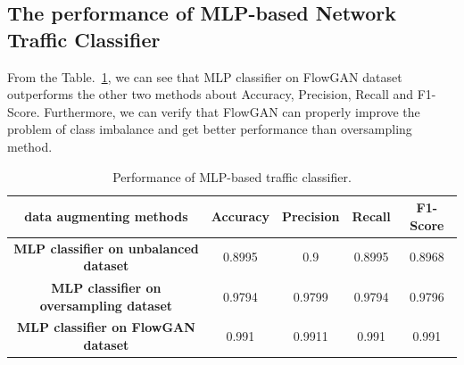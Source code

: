\documentclass[letterpaper,12pt]{article}
\begin{document}
\subsection{The performance of MLP-based Network Traffic Classifier}
From the Table.~\ref{table:performance_classifier}, we can see that MLP classifier on FlowGAN dataset outperforms the other two methods about Accuracy, Precision, Recall and F1-Score. Furthermore, we can verify that FlowGAN can properly improve the problem of class imbalance and get better performance than oversampling method. 
\begin{table}[ht!]
	\centering
	\caption{Performance of MLP-based traffic classifier.}\label{table:performance_classifier}
	\begin{tabular}{|c|c|c|c|c|}%
		\hline
		data augmenting methods & Accuracy & Precision & Recall & F1-Score \\
		\hline
		\textbf{MLP classifier on unbalanced dataset}  & 0.8995 & 0.9 & 0.8995 &  0.8968 \\
		\hline
		\textbf{MLP classifier on oversampling dataset}   & 0.9794 & 0.9799 & 0.9794& 0.9796 \\
		\hline
		\textbf{MLP classifier on FlowGAN dataset}   & 0.991 & 0.9911 & 0.991  & 0.991 \\
		\hline
	\end{tabular}
\end{table}
\end{document}
